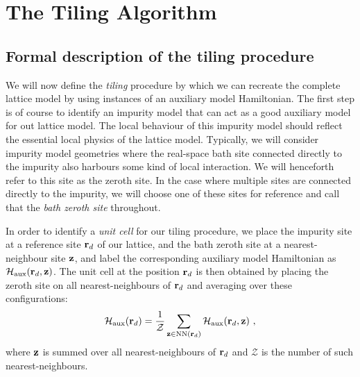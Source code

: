 \documentclass[reprint,hidelinks]{revtex4-2}
\begin{document}
\section{The Tiling Algorithm}

\subsection{Formal description of the tiling procedure}
We will now define the {\it tiling} procedure by which we can recreate the complete lattice model by using instances of an auxiliary model Hamiltonian. The first step is of course to identify an impurity model that can act as a good auxiliary model for out lattice model. The local behaviour of this impurity model should reflect the essential local physics of the lattice model. Typically, we will consider impurity model geometries where the real-space bath site connected directly to the impurity also harbours some kind of local interaction. We will henceforth refer to this site as the zeroth site. In the case where multiple sites are connected directly to the impurity, we will choose one of these sites for reference and call that the {\it bath zeroth site} throughout.

In order to identify a {\it unit cell} for our tiling procedure, we place the impurity site at a reference site \({\bf r}_d\) of our lattice, and the bath zeroth site at a nearest-neighbour site \({\bf z}\), and label the corresponding auxiliary model Hamiltonian as \(\mathcal{H}_\text{aux}({\bf r}_d, {\bf z})\). The unit cell at the position \({\bf r}_d\) is then obtained by placing the zeroth site on all nearest-neighbours of \({\bf r}_d\) and averaging over these configurations:
\begin{equation}\begin{aligned}\label{unitCellHamiltonian}
	\mathcal{H}_\text{aux}({\bf r}_d) = \frac{1}{\mathcal{Z}}\sum_{{\bf z}\in\text{NN}({\bf r}_d)}\mathcal{H}_\text{aux}({\bf r}_d, {\bf z})~,
\end{aligned}\end{equation}
where \({\bf z}\) is summed over all nearest-neighbours of \({\bf r}_d\) and \(\mathcal{Z}\) is the number of such nearest-neighbours.
\end{document}
